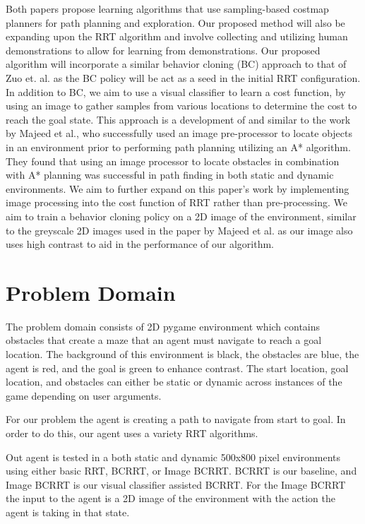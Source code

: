 \documentclass{article}
\begin{document}
Both papers propose learning algorithms that use sampling-based costmap planners for path planning and exploration. Our proposed method will also be expanding upon the RRT algorithm and involve collecting and utilizing human demonstrations to allow for learning from demonstrations. Our proposed algorithm will incorporate a similar behavior cloning (BC) approach to that of Zuo et. al. \cite{Zuo} as the BC policy will be act as a seed in the initial RRT configuration. In addition to BC, we aim to use a visual classifier to learn a cost function, by using an image to gather samples from various locations to determine the cost to reach the goal state. This approach is a development of and similar to the work by Majeed et al., who successfully used an image pre-processor to locate objects in an environment prior to performing path planning utilizing an A* algorithm. \cite{Majeed} They found that using an image processor to locate obstacles in combination with A* planning was successful in path finding in both static and dynamic environments. \cite{Majeed} We aim to further expand on this paper's work by implementing image processing into the cost function of RRT rather than pre-processing. We aim to train a behavior cloning policy on a 2D image of the environment, similar to the greyscale 2D images used in the paper by Majeed et al. as our image also uses high contrast to aid in the performance of our algorithm. 


\section{Problem Domain}

The problem domain consists of 2D pygame environment which contains obstacles that create a maze that an agent must navigate to reach a goal location. 
The background of this environment is black, the obstacles are blue, the agent is red, and the goal is green to enhance contrast. The start location, goal location, and obstacles can either be static or dynamic across instances of the game depending on user arguments.

For our problem the agent is creating a path to navigate from start to goal. In order to do this, our agent uses a variety RRT algorithms.

Out agent is tested in a both static and dynamic 500x800 pixel environments using either basic RRT, BCRRT, or Image BCRRT. BCRRT is our baseline, and Image BCRRT is our visual classifier assisted BCRRT. For the Image BCRRT the input to the agent is a 2D image of the environment with the action the agent is taking in that state.
\end{document}
